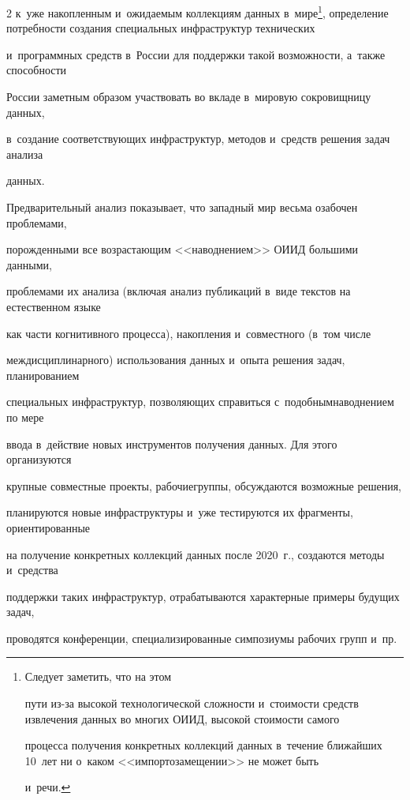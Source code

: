 \begin{multicols}{2}
к~уже накопленным и~ожидаемым коллекциям данных в~мире\footnote{Следует заметить, что на этом 


пути из-за высокой технологической сложности и~стоимости средств извлечения данных во многих ОИИД, высокой стоимости самого 


процесса получения конкретных коллекций данных в~течение ближайших 10~лет ни о~каком <<импортозамещении>> не может быть 


и~речи.}, определение потребности создания специальных инфраструктур технических 


и~программных средств в~России для поддержки такой возможности, а~так\-же способности 


России заметным образом участвовать во вкладе в~мировую сокровищницу данных, 


в~создание соответствующих инфраструктур, методов и~средств решения задач анализа 


данных.


  


  Предварительный анализ показывает, что западный мир весьма озабочен проблемами, 


по\-рож\-ден\-ны\-ми все возрастающим <<наводнением>> \mbox{ОИИД} большими данными, 


проблемами их анализа (включая анализ публикаций в~виде текстов на естественном языке 


как час\-ти когнитивного процесса), накопления и~совместного (в~том чис\-ле 


междисциплинарного) использования данных и~опыта решения задач, планированием 


специальных инфраструктур, позволяющих справиться с~подобным\linebreak наводнением по мере 


ввода в~действие новых инструментов получения данных. Для этого органи\-зуются 


крупные совместные проекты, рабочие\linebreak группы, обсуждаются возможные решения, 


планируются новые инфраструктуры и~уже тестируются их фрагменты, ориентированные 


на получение конкретных коллекций данных после 2020~г., создаются методы и~средства 


поддержки таких инфраструктур, отрабатываются характерные примеры будущих задач, 


проводятся конференции, специализи\-рованные симпозиумы рабочих групп и~пр.



\end{multicols}
